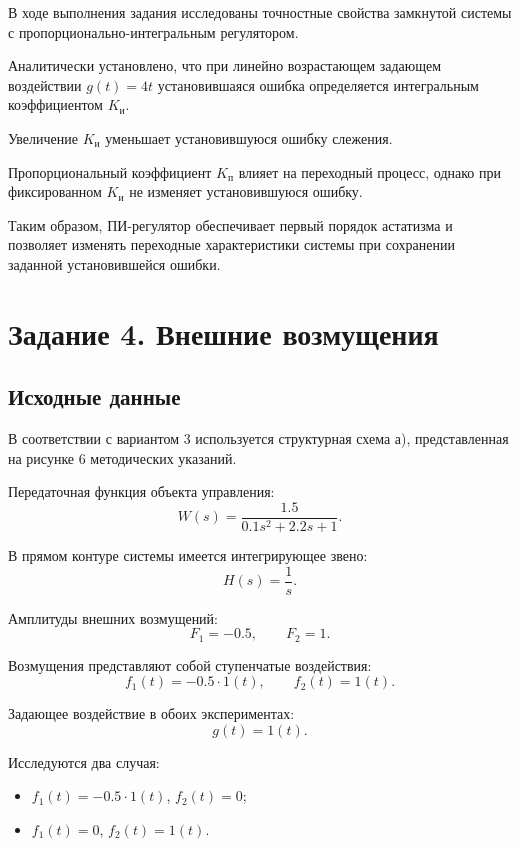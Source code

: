 \documentclass[12pt, a4paper]{article}
\begin{document}
В ходе выполнения задания исследованы
точностные свойства замкнутой системы
с пропорционально-интегральным регулятором.

Аналитически установлено, что при линейно
возрастающем задающем воздействии
$g(t)=4t$ установившаяся ошибка определяется
интегральным коэффициентом $K_{\text{и}}$.

Увеличение $K_{\text{и}}$ уменьшает
установившуюся ошибку слежения.

Пропорциональный коэффициент $K_{\text{п}}$
влияет на переходный процесс, однако
при фиксированном $K_{\text{и}}$
не изменяет установившуюся ошибку.

Таким образом, ПИ-регулятор обеспечивает
первый порядок астатизма и позволяет
изменять переходные характеристики системы
при сохранении заданной установившейся ошибки.






\newpage
\section{Задание 4. Внешние возмущения}

\subsection{Исходные данные}

В соответствии с вариантом 3 используется
структурная схема а), представленная
на рисунке 6 методических указаний.

Передаточная функция объекта управления:
\[
    W(s)=\frac{1.5}{0.1s^2+2.2s+1}.
\]

В прямом контуре системы имеется
интегрирующее звено:
\[
    H(s)=\frac{1}{s}.
\]

Амплитуды внешних возмущений:
\[
    F_1=-0.5,\qquad F_2=1.
\]

Возмущения представляют собой ступенчатые
воздействия:
\[
    f_1(t)=-0.5\cdot1(t),
    \qquad f_2(t)=1(t).
\]

Задающее воздействие в обоих экспериментах:
\[
    g(t)=1(t).
\]

Исследуются два случая:
\begin{itemize}
    \item $f_1(t)=-0.5\cdot1(t)$, $f_2(t)=0$;
    \item $f_1(t)=0$, $f_2(t)=1(t)$.
\end{itemize}
\end{document}
